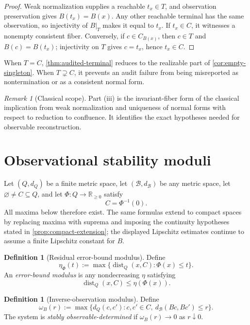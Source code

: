 \documentclass[11pt]{article}
\theoremstyle{definition}
\newtheorem{definition}[theorem]{Definition}
\theoremstyle{remark}
\newtheorem{remark}[theorem]{Remark}
\numberwithin{equation}{section}
\newcommand{\dist}{\operatorname{dist}}
\newcommand{\cB}{\mathcal B}
\begin{document}
\begin{proof}
Weak normalization supplies a reachable $t_x\in T$, and observation
preservation gives $B(t_x)=B(x)$.  Any other reachable terminal has the same
observation, so injectivity of $B|_T$ makes it equal to $t_x$.  If
$t_x\in C$, it witnesses a nonempty consistent fiber.  Conversely, if
$c\in C_{B(x)}$, then $c\in T$ and $B(c)=B(t_x)$; injectivity on $T$ gives
$c=t_x$, hence $t_x\in C$.
\end{proof}

When $T=C$, \cref{thm:audited-terminal} reduces to the realizable part of
\cref{cor:empty-singleton}.  When $T\supsetneq C$, it prevents an audit
failure from being misreported as nontermination or as a consistent normal
form.

\begin{remark}[Classical scope]
Part (iii) is the invariant-fiber form of the classical implication from weak
normalization and uniqueness of normal forms with respect to reduction to
confluence.  It identifies the exact hypotheses needed for observable
reconstruction.
\end{remark}

\section{Observational stability moduli}\label{sec:stability}

Let $(Q,d_Q)$ be a finite metric space, let $(\cB,d_{\cB})$ be any metric
space, let $\varnothing\ne C\subseteq Q$, and let
$\Phi:Q\to\mathbb R_{\ge0}$ satisfy
\[
 C=\Phi^{-1}(0).
\]
All maxima below therefore exist.  The same formulas extend to compact spaces
by replacing maxima with suprema and imposing the continuity hypotheses stated
in \cref{prop:compact-extension}; the displayed Lipschitz estimates continue
to assume a finite Lipschitz constant for $B$.

\begin{definition}[Residual error-bound modulus]
Define
\[
 \eta_\Phi(t):=
 \max\{\dist_Q(x,C):\Phi(x)\le t\}.
\]
An \emph{error-bound modulus} is any nondecreasing $\eta$ satisfying
\[
 \dist_Q(x,C)\le\eta(\Phi(x)).
\]
\end{definition}

\begin{definition}[Inverse-observation modulus]
Define
\[
 \omega_B(r):=
 \max\{d_Q(c,c'):c,c'\in C,\ d_{\cB}(Bc,Bc')\le r\}.
\]
The system is \emph{stably observable-determined} if $\omega_B(r)\to0$ as $r\downarrow0$.
\end{definition}
\end{document}
